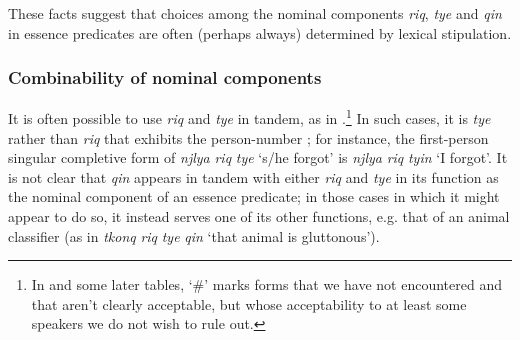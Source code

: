 \documentclass[output=paper]{langsci/langscibook}
\begin{document}
These facts suggest that choices among the nominal components \emph{riq}, \emph{tye} and \emph{qin} in essence predicates are often (perhaps always) determined by lexical stipulation.

  
\subsubsection{Combinability of nominal components} 

It is often possible to use \emph{riq} and \emph{tye} in tandem, as in .\footnote{In  and some later tables, `\#' marks forms that we have not encountered and that aren't
clearly acceptable, but whose acceptability to at least some speakers we do not wish to rule out.} In such cases, it is \emph{tye} rather
than \emph{riq} that exhibits the person-number ; for instance, the first-person singular completive
form of \emph{njlya} \emph{riq} \emph{tye} `s/he forgot' is \emph{njlya} \emph{riq} \emph{tyin} `I forgot'. It is not clear that \emph{qin}
appears in tandem with either \emph{riq} and \emph{tye} in its function as the nominal component of an
essence predicate; in those cases in which it might appear to do so, it instead serves one of its other functions, e.g. that of
an animal classifier (as in \emph{tkonq} \emph{riq} \emph{tye} \emph{qin} `that animal is gluttonous').
\end{document}
